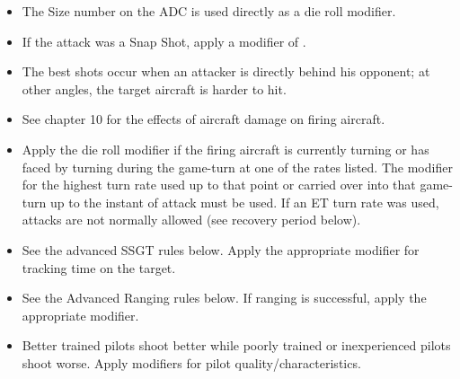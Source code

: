 \begin{itemize}

    \item{} 
    The Size number on the ADC is used directly as a die roll modifier.

    \item{} 
    If the attack was a Snap Shot, apply a modifier of .

    \item{}
    The best shots occur when an attacker is directly behind his opponent; at other angles, the target aircraft is harder to hit. 


    \item{} 
    See chapter 10 for the effects of aircraft damage on firing aircraft.

    \item
     Apply the die roll modifier if the firing aircraft is currently turning or has faced by turning during the game-turn at one of the rates listed. The modifier for the highest turn rate used up to that point or carried over into that game-turn up to the instant of attack must be used. If an ET turn rate was used, attacks are not normally allowed (see recovery period below).

    \item{} 
    See the advanced SSGT rules below. Apply the appropriate modifier for tracking time on the target.

    \item{} 
    See the Advanced Ranging rules below. If ranging is successful, apply the appropriate modifier.

    \item{} Better trained pilots shoot better while poorly trained or inexperienced pilots shoot worse. Apply modifiers for pilot quality/characteristics.

\end{itemize}

